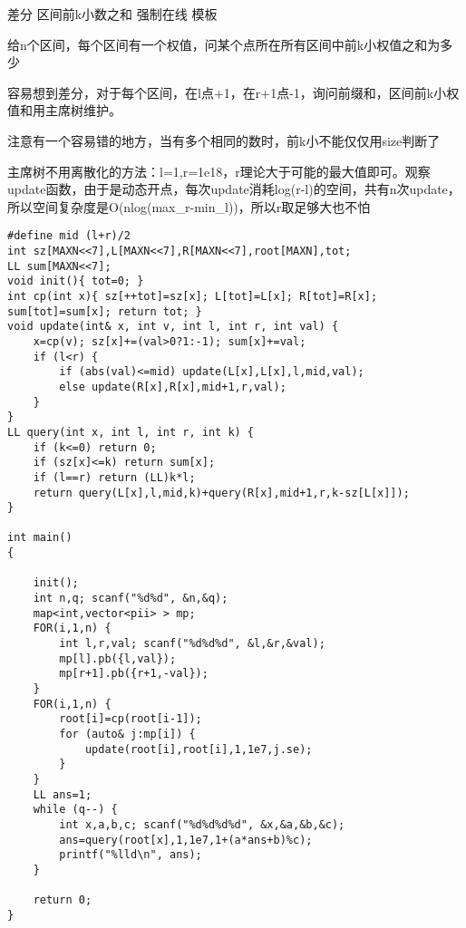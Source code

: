 差分 区间前k小数之和 强制在线 模板

给n个区间，每个区间有一个权值，问某个点所在所有区间中前k小权值之和为多少

容易想到差分，对于每个区间，在l点+1，在r+1点-1，询问前缀和，区间前k小权值和用主席树维护。

注意有一个容易错的地方，当有多个相同的数时，前k小不能仅仅用size判断了

主席树不用离散化的方法：l=1,r=1e18，r理论大于可能的最大值即可。观察update函数，由于是动态开点，每次update消耗log(r-l)的空间，共有n次update，所以空间复杂度是O(nlog(max\_r-min\_l))，所以r取足够大也不怕

\begin{lstlisting}
#define mid (l+r)/2
int sz[MAXN<<7],L[MAXN<<7],R[MAXN<<7],root[MAXN],tot;
LL sum[MAXN<<7];
void init(){ tot=0; }
int cp(int x){ sz[++tot]=sz[x]; L[tot]=L[x]; R[tot]=R[x]; sum[tot]=sum[x]; return tot; }
void update(int& x, int v, int l, int r, int val) {
    x=cp(v); sz[x]+=(val>0?1:-1); sum[x]+=val;
    if (l<r) {
        if (abs(val)<=mid) update(L[x],L[x],l,mid,val);
        else update(R[x],R[x],mid+1,r,val);
    }
}
LL query(int x, int l, int r, int k) {
    if (k<=0) return 0;
    if (sz[x]<=k) return sum[x];
    if (l==r) return (LL)k*l;
    return query(L[x],l,mid,k)+query(R[x],mid+1,r,k-sz[L[x]]);
}

int main()
{

    init();
    int n,q; scanf("%d%d", &n,&q);
    map<int,vector<pii> > mp;
    FOR(i,1,n) {
        int l,r,val; scanf("%d%d%d", &l,&r,&val);
        mp[l].pb({l,val});
        mp[r+1].pb({r+1,-val});
    }
    FOR(i,1,n) {
        root[i]=cp(root[i-1]);
        for (auto& j:mp[i]) {
            update(root[i],root[i],1,1e7,j.se);
        }
    }
    LL ans=1;
    while (q--) {
        int x,a,b,c; scanf("%d%d%d%d", &x,&a,&b,&c);
        ans=query(root[x],1,1e7,1+(a*ans+b)%c);
        printf("%lld\n", ans);
    }

    return 0;
}
\end{lstlisting}